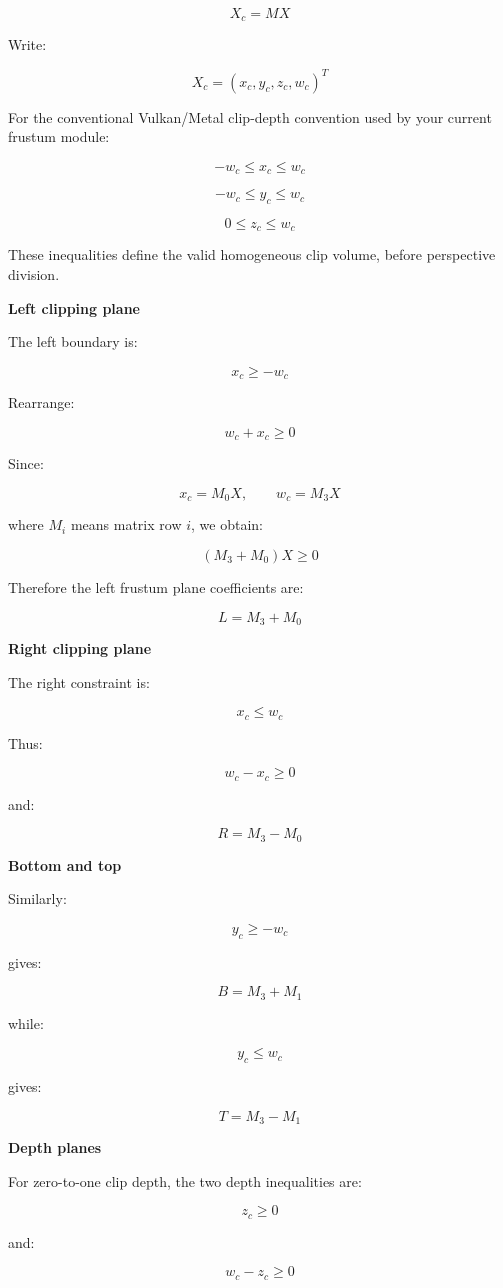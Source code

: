 \[
X_c=MX
\]

Write:

\[
X_c=(x_c,y_c,z_c,w_c)^T
\]

For the conventional Vulkan/Metal clip-depth convention used by your current frustum module:

\[
-w_c\le x_c\le w_c
\]

\[
-w_c\le y_c\le w_c
\]

\[
0\le z_c\le w_c
\]

These inequalities define the valid homogeneous clip volume, before perspective division.

\textbf{Left clipping plane}

The left boundary is:

\[
x_c\ge-w_c
\]

Rearrange:

\[
w_c+x_c\ge0
\]

Since:

\[
x_c=M_0X,\qquad w_c=M_3X
\]

where \(M_i\) means matrix row \(i\), we obtain:

\[
\boxed{ (M_3+M_0)X\ge0 }
\]

Therefore the left frustum plane coefficients are:

\[
\boxed{L=M_3+M_0}
\]

\textbf{Right clipping plane}

The right constraint is:

\[
x_c\le w_c
\]

Thus:

\[
w_c-x_c\ge0
\]

and:

\[
\boxed{R=M_3-M_0}
\]

\textbf{Bottom and top}

Similarly:

\[
y_c\ge-w_c
\]

gives:

\[
\boxed{B=M_3+M_1}
\]

while:

\[
y_c\le w_c
\]

gives:

\[
\boxed{T=M_3-M_1}
\]

\textbf{Depth planes}

For zero-to-one clip depth, the two depth inequalities are:

\[
z_c\ge0
\]

and:

\[
w_c-z_c\ge0
\]

